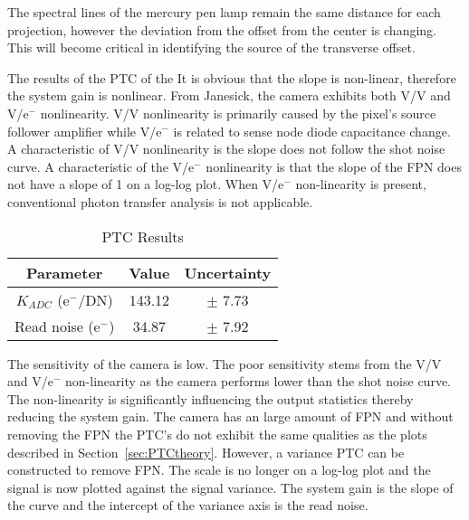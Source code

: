 The spectral lines of the mercury pen lamp remain the same distance for each projection, however the deviation from the offset from the center is changing. This will become critical in identifying the source of the transverse offset.


The results of the PTC of the It is obvious that the slope is non-linear, therefore the system gain is nonlinear. From Janesick, the camera exhibits both V/V and V/e$^-$ nonlinearity. V/V nonlinearity is primarily caused by the pixel's source follower amplifier while V/e$^-$ is related to sense node diode capacitance change\cite{janesick}. A characteristic of V/V nonlinearity is the slope does not follow the shot noise curve. A characteristic of the V/e$^-$ nonlinearity is that the slope of the FPN does not have a slope of 1 on a log-log plot. When  V/e$^-$ non-linearity is present, conventional photon transfer analysis is not applicable.

\begin{table}[htb] 
\caption{PTC Results} %
\label{table:PTC} %
\centering %
\begin{tabular}{ c c c } %
\hline
Parameter & Value & Uncertainty\\  %
\hline %
$K_{ADC}$ (e$^-$/DN)			& 143.12  	& $\pm$ 7.73\\
Read noise (e$^-$)				& 34.87 	& $\pm$ 7.92\\
\hline %
\end{tabular} 
\end{table}


The sensitivity of the camera is low. The poor sensitivity stems from the V/V and V/e$^-$ non-linearity as the camera performs lower than the shot noise curve\cite{janesick}. The non-linearity is significantly influencing the output statistics thereby reducing the system gain. The camera has an large amount of FPN and without removing the FPN the PTC's do not exhibit the same qualities as the plots described in Section~\ref{sec:PTCtheory}. However, a variance PTC can be constructed to remove FPN. The scale is no longer on a log-log plot and the signal is now plotted against the signal variance. The system gain is the slope of the curve and the intercept of the variance axis is the read noise. 


